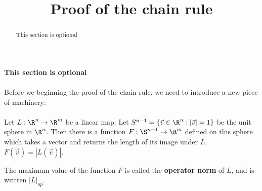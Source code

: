 \documentclass{ximera}
\title{Proof of the chain rule}
\begin{document}
	\begin{abstract}
		This section is optional
	\end{abstract}
	
	\textbf{This section is optional}
	\\
	\\
	Before we beginning the proof of the chain rule, we need to introduce a new piece of machinery:
	\\
	\\
	Let $L:\R^n \to \R^m$ be a linear map.  Let $S^{n-1} = \{ \vec{v} \in \R^n: |\vec{v}|  = 1\}$ be the unit sphere in $\R^n$.  Then there is a function
		$F: \S^{n-1} \to \R^m$ defined on this sphere which takes a vector and returns the length of its image under $L$, $F(\vec{v}) = |L(\vec{v})|$.  
		
	\begin{definition}
		The maximum value of the function $F$ is called the \textbf{operator norm} of $L$, and is written $|L|_{op}$.
	\end{definition}
	
\end{document}
